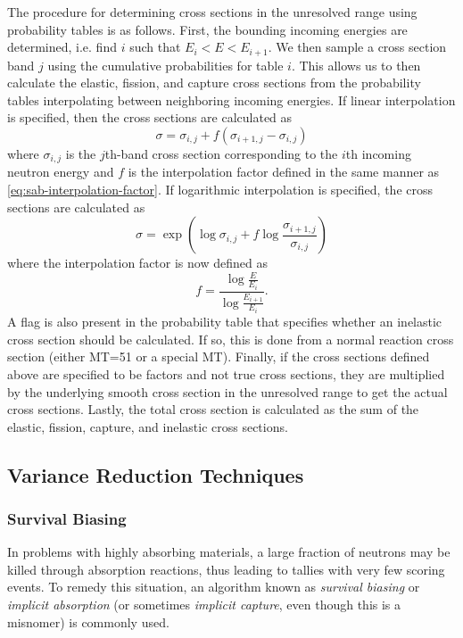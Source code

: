 The procedure for determining cross sections in the unresolved range using
probability tables is as follows. First, the bounding incoming energies are
determined, i.e. find $i$ such that $E_i < E < E_{i+1}$. We then sample a cross
section band $j$ using the cumulative probabilities for table $i$. This allows
us to then calculate the elastic, fission, and capture cross sections from the
probability tables interpolating between neighboring incoming energies. If
linear interpolation is specified, then the cross sections are calculated as
\begin{equation}
  \label{eq:ptables-linlin}
  \sigma = \sigma_{i,j} + f (\sigma_{i+1,j} - \sigma_{i,j})
\end{equation}
where $\sigma_{i,j}$ is the $j$th-band cross section corresponding to the $i$th
incoming neutron energy and $f$ is the interpolation factor defined in the same
manner as \eqref{eq:sab-interpolation-factor}. If logarithmic interpolation is
specified, the cross sections are calculated as
\begin{equation}
  \label{eq:ptables-loglog}
  \sigma = \exp \left ( \log \sigma_{i,j} + f \log
  \frac{\sigma_{i+1,j}}{\sigma_{i,j}} \right )
\end{equation}
where the interpolation factor is now defined as
\begin{equation}
  \label{eq:log-interpolation-factor}
  f = \frac{\log \frac{E}{E_i}}{\log \frac{E_{i+1}}{E_i}}.
\end{equation}
A flag is also present in the probability table that specifies whether an
inelastic cross section should be calculated. If so, this is done from a normal
reaction cross section (either MT=51 or a special MT). Finally, if the cross
sections defined above are specified to be factors and not true cross sections,
they are multiplied by the underlying smooth cross section in the unresolved
range to get the actual cross sections. Lastly, the total cross section is
calculated as the sum of the elastic, fission, capture, and inelastic cross
sections.

\subsection{Variance Reduction Techniques}

\subsubsection{Survival Biasing}

In problems with highly absorbing materials, a large fraction of neutrons may be
killed through absorption reactions, thus leading to tallies with very few
scoring events. To remedy this situation, an algorithm known as \emph{survival
  biasing} or \emph{implicit absorption} (or sometimes \emph{implicit capture},
even though this is a misnomer) is commonly used.

